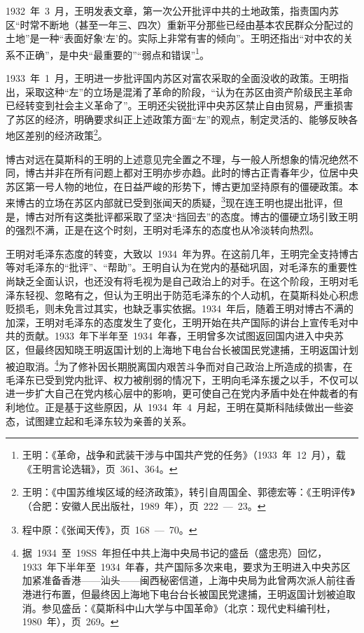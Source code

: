 1932~年~3~月，王明发表文章，第一次公开批评中共的土地政策，指责国内苏区“时常不断地（甚至一年三、四次）重新平分那些已经由基本农民群众分配过的土地”是一种“表面好象‘左’的。实际上非常有害的倾向”。王明还指出“对中农的关系不正确”，是中央“最重要的”“弱点和错误”\footnote{王明：《革命，战争和武装干涉与中国共产党的任务》（1933~年~12~月），载《王明言论选辑》，页~361、364。}。

1933~年~1~月，王明进一步批评国内苏区对富农采取的全面没收的政策。王明指出，采取这种“左”的立场是混淆了革命的阶段，“认为在苏区由资产阶级民主革命已经转变到社会主义革命了”。王明还尖锐批评中央苏区禁止自由贸易，严重损害了苏区的经济，明确要求纠正上述政策方面“左”的观点，制定灵活的、能够反映各地区差别的经济政策\footnote{王明：《中国苏维埃区域的经济政策》，转引自周国全、郭德宏等：《王明评传》（合肥：安徽人民出版社，1989~年），页~222~—~23。}。

博古对远在莫斯科的王明的上述意见完全置之不理，与一般人所想象的情况绝然不同，博古并非在所有问题上都对王明亦步亦趋。此时的博古正青春年少，位居中央苏区第一号人物的地位，在日益严峻的形势下，博古更加坚持原有的僵硬政策。本来博古的立场在苏区内部就已受到张闻天的质疑，\footnote{程中原：《张闻天传》，页~168~—~70。}现在连王明也提出批评，但是，博古对所有这类批评都采取了坚决“挡回去”的态度。博古的僵硬立场引致王明的强烈不满，正是在这个时刻，王明对毛泽东的态度也从冷淡转向热烈。

王明对毛泽东态度的转变，大致以~1934~年为界。在这前几年，王明完全支持博古等对毛泽东的“批评”、“帮助”。王明自认为在党内的基础巩固，对毛泽东的重要性尚缺乏全面认识，也还没有将毛视为是自己政治上的对手。在这个阶段，王明对毛泽东轻视、忽略有之，但认为王明出于防范毛泽东的个人动机，在莫斯科处心积虑贬损毛，则未免言过其实，也缺乏事实依据。1934~年后，随着王明对博古不满的加深，王明对毛泽东的态度发生了变化，王明开始在共产国际的讲台上宣传毛对中共的贡献。1933~年下半年至~1934~年春，王明曾多次试图返回国内进入中央苏区，但最终因知晓王明返国计划的上海地下电台台长被国民党逮捕，王明返国计划被迫取消。\footnote{据~1934~至~19SS~年担任中共上海中央局书记的盛岳（盛忠亮）回忆，1933~年下半年至~1934~年春，共产国际多次来电，要求为王明进入中央苏区加紧准备香港——汕头——闽西秘密信道，上海中央局为此曾两次派人前往香港进行布置，但最终因上海地下电台台长被国民党逮捕，王明返国计划被迫取消。参见盛岳：《莫斯科中山大学与中国革命》（北京：现代史料编刊杜，1980~年），页~269。}为了修补因长期脱离国内艰苦斗争而对自己政治上所造成的损害，在毛泽东已受到党内批评、权力被削弱的情况下，王明向毛泽东援之以手，不仅可以进一步扩大自己在党内核心层中的影响，更可使自己在党内矛盾中处在仲裁者的有利地位。正是基于这些原因，从~1934~年~4~月起，王明在莫斯科陆续做出一些姿态，试图建立起和毛泽东较为亲善的关系。


